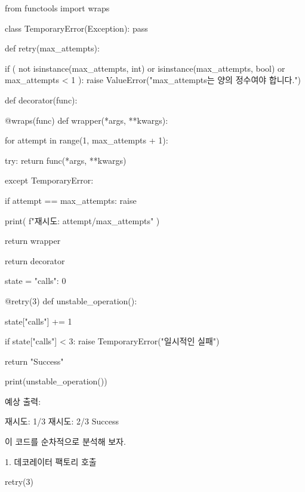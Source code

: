 \begin{dhkcode}
from functools import wraps

class TemporaryError(Exception):
    pass

def retry(max_attempts):

    if (
        not isinstance(max_attempts, int)
        or isinstance(max_attempts, bool)
        or max_attempts < 1
    ):
        raise ValueError("max_attempts는 양의 정수여야 합니다.")

    def decorator(func):

        @wraps(func)
        def wrapper(*args, **kwargs):

            for attempt in range(1, max_attempts + 1):

                try:
                    return func(*args, **kwargs)

                except TemporaryError:

                    if attempt == max_attempts:
                        raise

                    print(
                        f"재시도: {attempt}/{max_attempts}"
                    )

        return wrapper

    return decorator


state = {"calls": 0}


@retry(3)
def unstable_operation():

    state["calls"] += 1

    if state["calls"] < 3:
        raise TemporaryError("일시적인 실패")

    return "Success"


print(unstable_operation())
\end{dhkcode}

예상 출력:

\begin{dhkzsh}
재시도: 1/3
재시도: 2/3
Success
\end{dhkzsh}

이 코드를 순차적으로 분석해 보자.

\begin{dhknote}
\begin{dhksmry}[centered]
1. 데코레이터 팩토리 호출
\end{dhksmry}
\end{dhknote}

\begin{dhkcode}
retry(3)
\end{dhkcode}

